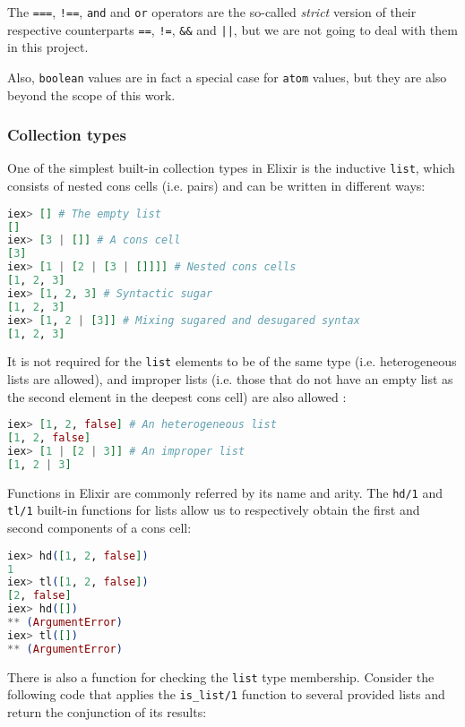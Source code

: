 The \verb|===|, \verb|!==|, \verb|and| and \verb|or| operators are the so-called
\textit{strict} version of their respective counterparts \verb|==|, \verb|!=|,
\verb|&&| and \verb+||+, but we are not going to deal with them in this project.

Also, \verb|boolean| values are in fact a special case for \verb|atom| values,
but they are also beyond the scope of this work. 

\subsubsection{Collection types}

One of the simplest built-in collection types in Elixir is the inductive 
\verb|list|, which consists of nested cons cells (i.e. pairs) and can be written
in different ways:

\begin{lstlisting}[language=elixir,numbers=none,frame=none]
iex> [] # The empty list 
[] 
iex> [3 | []] # A cons cell
[3]
iex> [1 | [2 | [3 | []]]] # Nested cons cells
[1, 2, 3]
iex> [1, 2, 3] # Syntactic sugar
[1, 2, 3]
iex> [1, 2 | [3]] # Mixing sugared and desugared syntax
[1, 2, 3]
\end{lstlisting}

It is not required for the \verb|list| elements to be of the same type (i.e.
heterogeneous lists are allowed), and improper lists (i.e. those that do not
have an empty list as the second element in the deepest cons cell) are also
allowed \citep{ElixirDocs}:

\begin{lstlisting}[language=elixir,numbers=none,frame=none]
iex> [1, 2, false] # An heterogeneous list
[1, 2, false]
iex> [1 | [2 | 3]] # An improper list
[1, 2 | 3]
\end{lstlisting}

Functions in Elixir are commonly referred by its name and arity. The \verb|hd/1|
and \verb|tl/1| built-in functions for lists allow us to respectively obtain the
first and second components of a cons cell:

\begin{lstlisting}[language=elixir,numbers=none,frame=none]
iex> hd([1, 2, false])
1
iex> tl([1, 2, false])
[2, false]
iex> hd([])
** (ArgumentError)
iex> tl([])
** (ArgumentError)
\end{lstlisting}

There is also a function for checking the \verb|list| type membership. Consider
the following code that applies the \verb|is_list/1| function to several
provided lists and return the conjunction of its results:

